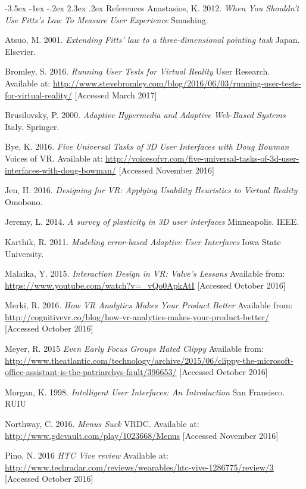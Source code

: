 \documentclass[12pt]{article}
\makeatletter
\renewcommand{\section}{\@startsection {section}{1}{\z@}%
             {-3.5ex \@plus -1ex \@minus -.2ex}%
             {2.3ex \@plus .2ex}%
             {\normalfont\Large\scshape\bfseries}}
\makeatother
\begin{document}
\pagebreak

\section{References}
Anastasios, K. 2012. \emph{When You Shouldn't Use Fitts's Law To Measure User Experience} Smashing. 

Atsuo, M. 2001. \emph{Extending Fitts' law to a three-dimensional pointing task} Japan. Elsevier. 

Bromley, S. 2016. \emph{Running User Tests for Virtual Reality} User Research. Available at: \url{http://www.stevebromley.com/blog/2016/06/03/running-user-tests-for-virtual-reality/} [Accessed March 2017]

Brusilovsky, P. 2000. \emph{Adaptive Hypermedia and Adaptive Web-Based Systems} Italy. Springer.

Bye, K. 2016. \emph{Five Universal Tasks of 3D User Interfaces with Doug Bowman} Voices of VR. Available at: \url{http://voicesofvr.com/five-universal-tasks-of-3d-user-interfaces-with-doug-bowman/} [Accessed November 2016]

Jen, H. 2016. \emph{Designing for VR: Applying Usability Heuristics to Virtual Reality} Omobono. 

Jeremy, L. 2014. \emph{A survey of plasticity in 3D user interfaces} Minneapolis. IEEE. 

Karthik, R. 2011. \emph{Modeling error-based Adaptive User Interfaces} Iowa State University. 

Malaika, Y. 2015. \emph{Interaction Design in VR: Valve's Lessons } Available from: \url{https://www.youtube.com/watch?v=_vQo0ApkAtI} [Accessed October 2016]

Merki, R. 2016. \emph{How VR Analytics Makes Your Product Better} Available from: \url{http://cognitivevr.co/blog/how-vr-analytics-makes-your-product-better/} [Accessed October 2016]

Meyer, R. 2015 \emph{Even Early Focus Groups Hated Clippy} Available from: \url{http://www.theatlantic.com/technology/archive/2015/06/clippy-the-microsoft-office-assistant-is-the-patriarchys-fault/396653/} [Accessed October 2016]

Morgan, K. 1998. \emph{Intelligent User Interfaces: An Introduction} San Fransisco. RUIU 

Northway, C. 2016. \emph{Menus Suck} VRDC. Available at: \url{http://www.gdcvault.com/play/1023668/Menus} [Accessed November 2016]

Pino, N. 2016 \emph{HTC Vive review} Available at: \url{http://www.techradar.com/reviews/wearables/htc-vive-1286775/review/3} [Accessed October 2016]
\end{document}
